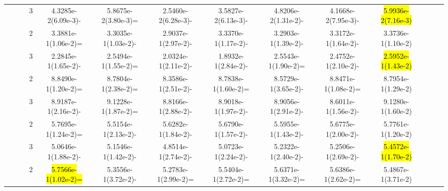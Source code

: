 \documentclass[a4paper,fleqn]{cas-dc}
\newcommand{\highlight}[1]{
	\begingroup
	\sethlcolor{Seashell}%
	\hl{#1}%
	\endgroup
}
\begin{document}
\begin{sloppypar}
\begin{table}[ht]
{\begin{tabular}{ccccccccccccc}
					
					\multirow{8}{*}{~}&\multirow{2}{*}{~}&3		&4.3285e-2(6.09e-3)-	&5.8675e-2(3.80e-3)=	&2.5460e-2(6.28e-3)-	&3.5827e-2(6.13e-3)-	&4.8206e-2(1.31e-2)-	&4.1668e-2(7.95e-3)-	&\highlight{5.9936e-2(7.16e-3)}\\
					
					
					
					
					
					\multirow{8}{*}{~}&\multirow{2}{*}{ZCAT9}&2 &3.3881e-1(1.06e-2)=	&3.3035e-1(1.03e-2)-	&2.9037e-1(2.97e-2)-	&3.3370e-1(1.17e-2)-	&3.2903e-1(1.39e-2)-	&3.3172e-1(1.64e-2)-	&3.3736e-1(1.10e-2)\\
					
					\multirow{8}{*}{~}&\multirow{2}{*}{~}&3	 &2.2845e-1(1.65e-2)- &2.5494e-1(1.55e-2)=	&2.0324e-1(2.11e-2)-	&1.8932e-1(2.84e-2)-	&2.5543e-1(1.90e-2)=	&2.4752e-1(2.10e-2)-	&\highlight{2.5952e-1(1.43e-2)}\\
					\hline
					
					
					
					
					
					
					
					
					
					
					
					\multirow{8}{*}{Flat}&\multirow{2}{*}{ZCAT5}&2 &8.8490e-1(1.20e-2)= &8.7804e-1(2.38e-2)=	&8.3586e-1(2.51e-2)-	&8.7838e-1(1.60e-2)=	&8.5729e-1(3.65e-2)-	&8.8471e-1(1.08e-2)=	&8.7954e-1(1.29e-2)\\
					\multirow{8}{*}{~}&\multirow{2}{*}{~}&3 &8.9187e-1(2.16e-2)- &9.1228e-1(1.87e-2)=	&8.8166e-1(2.88e-2)-	&8.9018e-1(1.97e-2)-	&8.9056e-1(2.91e-2)-	&8.6011e-1(1.56e-2)-	&9.1280e-1(1.60e-2)\\
					
					
					\multirow{8}{*}{~}&\multirow{2}{*}{ZCAT6}&2	 &5.7695e-1(1.24e-2)= &5.5154e-1(2.13e-2)-	&5.6282e-1(1.84e-2)-	&5.6790e-1(1.57e-2)-	&5.5955e-1(1.43e-2)-	&5.6775e-1(2.00e-2)-	&5.7761e-1(1.20e-2)\\
					
					\multirow{8}{*}{~}&\multirow{2}{*}{~}&3	&5.0646e-1(1.88e-2)-	&5.1546e-1(1.42e-2)-	&4.8514e-1(2.74e-2)-	&5.0723e-1(2.24e-2)-	&5.2322e-1(2.40e-2)-	&5.2506e-1(2.69e-2)-	&\highlight{5.4572e-1(1.70e-2)}\\
					
					
					
					\multirow{8}{*}{~}&\multirow{2}{*}{ZCAT7}&2 &\highlight{5.7566e-1(1.02e-2)=} &5.3556e-1(3.72e-2)-	&5.2783e-1(2.99e-2)=	&5.5404e-1(2.72e-2)=	&5.6371e-1(3.32e-2)=	&5.6386e-1(2.62e-2)=	&5.4867e-1(3.71e-2)\\
					

\end{tabular}}
\end{table}
\end{sloppypar}
\end{document}
